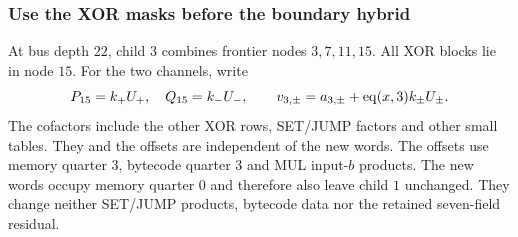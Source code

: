 \subsubsection{Use the XOR masks before the boundary hybrid}

At bus depth $22$, child $3$ combines frontier nodes $3,7,11,15$. All XOR blocks lie in node $15$. For the two channels, write
\[
 P_{15}=k_+U_+,\quad Q_{15}=k_-U_-,\qquad
 v_{3,\pm}=a_{3,\pm}+\operatorname{eq}(x,3)k_\pm U_\pm.
\]
The cofactors include the other XOR rows, SET/JUMP factors and other small tables. They and the offsets are independent of the new words. The offsets use memory quarter $3$, bytecode quarter $3$ and MUL input-$b$ products. The new words occupy memory quarter $0$ and therefore also leave child $1$ unchanged. They change neither SET/JUMP products, bytecode data nor the retained seven-field residual.

